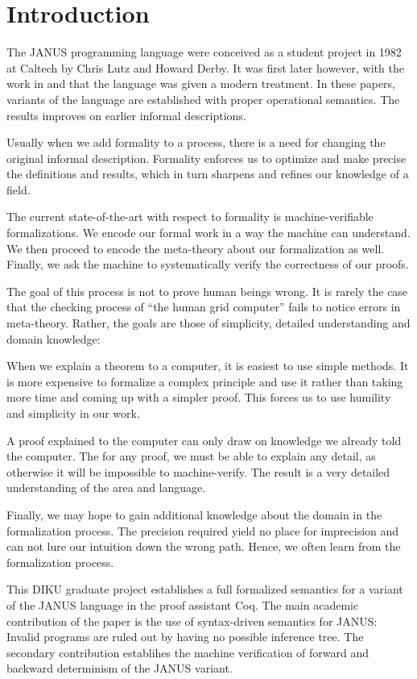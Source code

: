 \chapter{Introduction}

The JANUS programming language were conceived as a student project in
1982 at Caltech by Chris Lutz and Howard Derby. It was first later
however, with the work in \cite{glueck2007} and \cite{glueck2008} that
the language was given a modern treatment. In these papers, variants
of the language are established with proper operational semantics. The
results improves on earlier informal descriptions.

Usually when we add formality to a process, there is a need for
changing the original informal description. Formality enforces us to
optimize and make precise the definitions and results, which in turn
sharpens and refines our knowledge of a field.

The current state-of-the-art with respect to formality is
machine-verifiable formalizations. We encode our formal work in a way
the machine can understand. We then proceed to encode the meta-theory
about our formalization as well. Finally, we ask the machine to
systematically verify the correctness of our proofs.

The goal of this process is not to prove human beings wrong. It is
rarely the case that the checking process of ``the human grid
computer'' fails to notice errors in meta-theory. Rather, the goals
are those of simplicity, detailed understanding and domain knowledge:

When we explain a theorem to a computer, it is easiest to use simple
methods. It is more expensive to formalize a complex principle and use
it rather than taking more time and coming up with a simpler
proof. This forces us to use humility and simplicity in our work.

A proof explained to the computer can only draw on knowledge we
already told the computer. The for any proof, we must be able to
explain any detail, as otherwise it will be impossible to
machine-verify. The result is a very detailed understanding of the
area and language.

Finally, we may hope to gain additional knowledge about the domain in
the formalization process. The precision required yield no place for
imprecision and can not lure our intuition down the wrong path. Hence,
we often learn from the formalization process.

This DIKU graduate project establishes a full formalized semantics for
a variant of the JANUS language in the proof assistant Coq. The
main academic contribution of the paper is the use of syntax-driven
semantics for JANUS: Invalid programs are ruled out by having no possible
inference tree. The secondary contribution establihes the machine
verification of forward and backward determinism of the JANUS variant.

